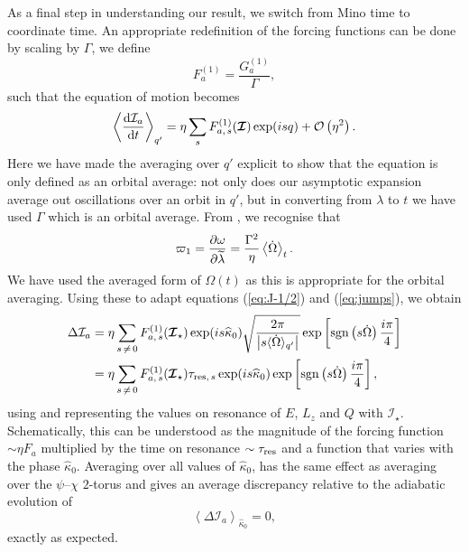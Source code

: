As a final step in understanding our result, we switch from Mino time to coordinate time. An appropriate redefinition of the forcing functions can be done by scaling by $\Gamma$, we define
\begin{equation}
F_a^{(1)} = \dfrac{G_a^{(1)}}{\Gamma},
\end{equation}
such that the equation of motion becomes
\begin{equation}
\left\langle \dfrac{\mathrm{d} {\mathcal{I}_a}}{\mathrm{d} {t}}\right\rangle_{q'} =  \eta\sum_s F_{a,\,s}^{(1)}(\boldsymbol{\mathcal{I}})\exp(is q) + \mathcal{O}\left({\eta^2}\right).
\end{equation}
Here we have made the averaging over $q'$ explicit to show that the equation is only defined as an orbital average: not only does our asymptotic expansion average out oscillations over an orbit in $q'$, but in converting from $\lambda$ to $t$ we have used $\Gamma$ which is an orbital average.
From , we recognise that
\begin{equation}
\varpi_1 = \dfrac{\partial {\omega}}{\partial {\widetilde{\lambda}}} = \dfrac{\Gamma^2}{\eta}\left\langle\dot{\Omega}\right\rangle_t.
\end{equation}
We have used the averaged form of $\Omega(t)$ as this is appropriate for the orbital averaging. Using these to adapt equations (\ref{eq:J-1/2}) and (\ref{eq:jumps}), we obtain
\begin{align}
\Delta \mathcal{I}_a = {} & \eta\sum_{s\,\neq\,0}F_{a,\,s}^{(1)}(\boldsymbol{\mathcal{I}}_\star)\exp(is \widehat{\kappa}_0)\sqrt{\dfrac{2\pi}{\left|s \langle\dot{\Omega}\rangle_{q'}\right|}}\exp\left[\operatorname{sgn}\left(s\dot{\Omega}\right)\dfrac{i\pi}{4}\right] \\
 = {} & \eta\sum_{s\,\neq\,0}F_{a,\,s}^{(1)}(\boldsymbol{\mathcal{I}}_\star)\tau_{\mathrm{res},\,s}\exp(is \widehat{\kappa}_0)\exp\left[\operatorname{sgn}\left(s\dot{\Omega}\right)\dfrac{i\pi}{4}\right],
\end{align}
using  and representing the values on resonance of $E$, $L_z$ and $Q$ with $\boldsymbol{\mathcal{I}}_\star$. Schematically, this can be understood as the magnitude of the forcing function $\sim \eta F_a$ multiplied by the time on resonance $\sim \tau_\mathrm{res}$ and a function that varies with the phase $\widehat{\kappa}_0$. Averaging over all values of $\widehat{\kappa}_0$, has the same effect as averaging over the $\psi$--$\chi$ $2$-torus and gives an average discrepancy relative to the adiabatic evolution of
\begin{equation}
\left\langle \Delta \mathcal{I}_a \right\rangle_{\hat{\kappa}_0} = 0,
\end{equation}
exactly as expected.

